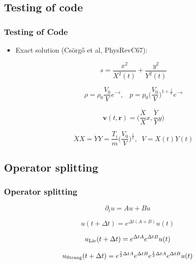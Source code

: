 \documentclass{beamer}
\begin{document}
\subsection{Testing of code}
\begin{frame}[noframenumbering]
\frametitle{Testing of Code}
\begin{itemize}
  \setlength{\itemsep}{5pt}
\item<1| only@1> Exact solution (Csörgő et al, PhysRevC67):

\begin{equation*}
s=\frac{x^2}{X^2(t)}+\frac{y^2}{Y^2(t)}
\end{equation*}

\begin{equation*}
\rho = \rho_0\frac{V_0}{V}e^{-s},\;\;\; p=p_0\bigg(\frac{V_0}{V}\bigg)^{1+\frac{1}{\kappa}}e^{-s}
\end{equation*}

\begin{equation*}
\bm{v}(t, \bm{r})=\bigg(\frac{\dot{X}}{X}x, \frac{\dot{Y}}{Y}y\bigg)
\end{equation*}

\begin{equation*}
\ddot{X}X=\ddot{Y}Y=\frac{T_i}{m}\bigg(\frac{V_0}{V}\bigg)^{\frac{1}{\kappa}},\;\;V=X(t)Y(t)
\end{equation*}
\end{itemize}
\end{frame}


\subsection{Operator splitting}
\begin{frame}[noframenumbering]
\frametitle{Operator splitting}
\begin{large}
\begin{equation*}
\partial_t u = Au+Bu
\end{equation*}

\begin{equation*}
u(t+\Delta t)=e^{\Delta t(A+B)}u(t)
\end{equation*}


\begin{equation*}
u_{\rm{Lie}}(t+\Delta t)=e^{\Delta tA}e^{\Delta tB}u(t)
\end{equation*}

\begin{equation*}
u_{\rm{Strang}}(t+\Delta t)=e^{\frac{1}{2}\Delta tA}e^{\Delta tB}e^{\frac{1}{2}\Delta tA}e^{\Delta tB}u(t)
\end{equation*}
\end{large}
\end{frame}
\end{document}
